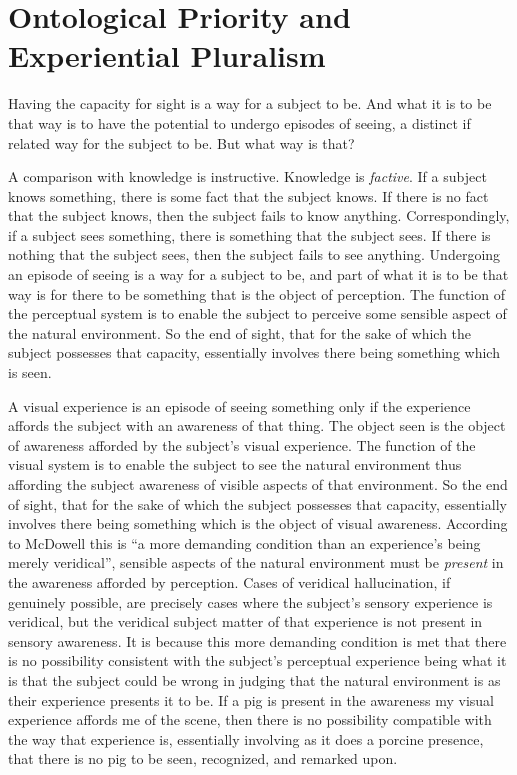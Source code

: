 \documentclass[12pt]{article}
\begin{document}

\section{Ontological Priority and Experiential Pluralism} %
\label{sec:ontological_priority_and_experiential_pluralism}

Having the capacity for sight is a way for a subject to be. And what it is to be that way is to have the potential to undergo episodes of seeing, a distinct if related way for the subject to be. But what way is that?

A comparison with knowledge is instructive. Knowledge is \emph{factive}. If a subject knows something, there is some fact that the subject knows. If there is no fact that the subject knows, then the subject fails to know anything. Correspondingly, if a subject sees something, there is something that the subject sees. If there is nothing that the subject sees, then the subject fails to see anything. Undergoing an episode of seeing is a way for a subject to be, and part of what it is to be that way is for there to be something that is the object of perception. The function of the perceptual system is to enable the subject to perceive some sensible aspect of the natural environment. So the end of sight, that for the sake of which the subject possesses that capacity, essentially involves there being something which is seen.

A visual experience is an episode of seeing something only if the experience affords the subject with an awareness of that thing. The object seen is the object of awareness afforded by the subject's visual experience. The function of the visual system is to enable the subject to see the natural environment thus affording the subject awareness of visible aspects of that environment. So the end of sight, that for the sake of which the subject possesses that capacity, essentially involves there being something which is the object of visual awareness. According to McDowell this is ``a more demanding condition than an experience's being merely veridical'', sensible aspects of the natural environment must be \emph{present} in the awareness afforded by perception. Cases of veridical hallucination, if genuinely possible, are precisely cases where the subject's sensory experience is veridical, but the veridical subject matter of that experience is not present in sensory awareness. It is because this more demanding condition is met that there is no possibility consistent with the subject's perceptual experience being what it is that the subject could be wrong in judging that the natural environment is as their experience presents it to be. If a pig is present in the awareness my visual experience affords me of the scene, then there is no possibility compatible with the way that experience is, essentially involving as it does a porcine presence, that there is no pig to be seen, recognized, and remarked upon.
\end{document}
